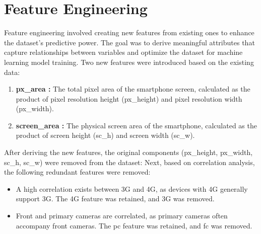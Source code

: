 \documentclass[12pt]{report}
\begin{document}
\section{Feature Engineering}
Feature engineering involved creating new features from existing ones to enhance the dataset's predictive power. The goal was to derive meaningful attributes that capture relationships between variables and optimize the dataset for machine learning model training. Two new features were introduced based on the existing data:
\vspace{-1.25em}
\begin{enumerate}
	\setlength\itemsep{-1.05em}
	\item{\textbf{px\_area :}} The total pixel area of the smartphone screen, calculated as the product of pixel resolution height (px\_height) and pixel resolution width (px\_width).
	\item{\textbf{screen\_area :}} The physical screen area of the smartphone, calculated as the product of screen height (sc\_h) and screen width (sc\_w).
\end{enumerate}
After deriving the new features, the original components (px\_height, px\_width, sc\_h, sc\_w) were removed from the dataset:
Next, based on correlation analysis, the following redundant features were removed:
\vspace{-1.25em}
\begin{itemize}
	\setlength\itemsep{-1.05em}
	\item A high correlation exists between 3G and 4G, as devices with 4G generally support 3G. The 4G feature was retained, and 3G was removed.
	\item Front and primary cameras are correlated, as primary cameras often accompany front cameras. The pc feature was retained, and fc was removed.
\end{itemize}
\end{document}
